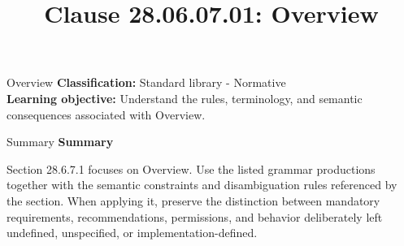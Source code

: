 \documentclass[10pt,letterpaper]{article}
\title{Clause 28.06.07.01: Overview}
\author{}
\date{}
\begin{document}
\maketitle
\begin{CornellOverviewBox}{Overview}
\textbf{Classification:} Standard library - Normative\\[2pt]
\textbf{Learning objective:} Understand the rules, terminology, and semantic consequences associated with Overview.
\end{CornellOverviewBox}\begin{CornellSummaryBox}{Summary}
{\sffamily\bfseries\color{Accent} Summary}\par\vspace{3pt}Section 28.6.7.1 focuses on Overview. Use the listed grammar productions together with the semantic constraints and disambiguation rules referenced by the section. When applying it, preserve the distinction between mandatory requirements, recommendations, permissions, and behavior deliberately left undefined, unspecified, or implementation-defined.
\end{CornellSummaryBox}
\end{document}
